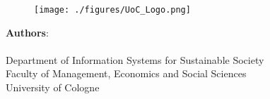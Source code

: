 \makeatletter
\begin{titlepage}
    \begin{center}
        \vspace{0.9cm}

        \Large
        \textbf{\@title}

        \vspace{0.9cm}

        \thesistype{}

        \vspace{0.9cm}

        \begin{figure}[htbp]
            \centering
            \texttt{[image: ./figures/UoC\_Logo.png]}
        \end{figure}

        \vspace{1cm}

        \large
        \textbf{Authors}: \\
        \thesisauthor{} \\

        \vspace{1cm}
        \large
        Department of Information Systems for Sustainable Society\\
        Faculty of Management, Economics and Social Sciences\\
        University of Cologne\\

        \vspace{1cm}
        \@date

    \end{center}
\end{titlepage}
\makeatother
